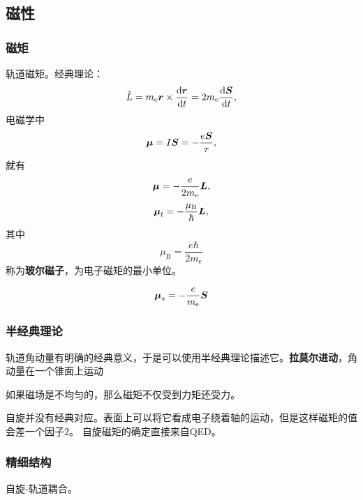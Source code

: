 \documentclass[UTF8, a4paper]{ctexart}
\begin{document}
\subsection{磁性}

\subsubsection{磁矩}

轨道磁矩。经典理论：
\[
    \hat{L} = m_\text{e} \vb*{r} \times \dv{\vb*{r}}{t} = 2 m_\text{e} \dv{\vb*{S}}{t},
\]
电磁学中
\[
    \vb*{\mu} = I \vb*{S} = - \frac{e \vb*{S}}{\tau},
\]
就有
\[
    \vb*{\mu} = - \frac{e}{2m_\text{e}} \vb*{L},
\]
\begin{equation}
    \vb*{\mu}_l = - \frac{\mu_\text{B}}{\hbar} \vb*{L},
\end{equation}
其中
\begin{equation}
    \mu_\text{B} = \frac{e\hbar}{2m_\text{e}}
\end{equation}
称为\textbf{玻尔磁子}，为电子磁矩的最小单位。

\begin{equation}
    \vb*{\mu}_s = - \frac{e}{m_\text{e}} \vb*{S}
\end{equation}

\subsubsection{半经典理论}

轨道角动量有明确的经典意义，于是可以使用半经典理论描述它。\textbf{拉莫尔进动}，角动量在一个锥面上运动

如果磁场是不均匀的，那么磁矩不仅受到力矩还受力。

自旋并没有经典对应。表面上可以将它看成电子绕着轴的运动，但是这样磁矩的值会差一个因子$2$。
自旋磁矩的确定直接来自QED。

\subsubsection{精细结构}

自旋-轨道耦合。
\end{document}
